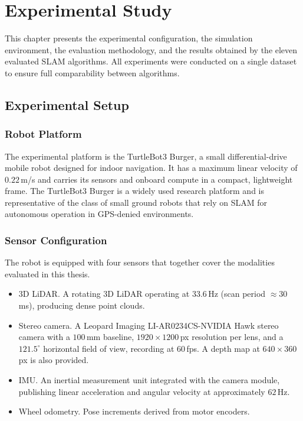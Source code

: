 \chapter{Experimental Study}

This chapter presents the experimental configuration, the simulation environment,
the evaluation methodology, and the results obtained by the eleven evaluated SLAM
algorithms.
All experiments were conducted on a single dataset to ensure full comparability
between algorithms.

\section{Experimental Setup}

\subsection{Robot Platform}

The experimental platform is the TurtleBot3 Burger, a small differential-drive
mobile robot designed for indoor navigation.
It has a maximum linear velocity of $0.22$\,m/s and carries its sensors and
onboard compute in a compact, lightweight frame.
The TurtleBot3 Burger is a widely used research platform and is representative
of the class of small ground robots that rely on SLAM for autonomous operation
in GPS-denied environments.

\subsection{Sensor Configuration}

The robot is equipped with four sensors that together cover the modalities
evaluated in this thesis.

\begin{itemize}
  \item 3D LiDAR. A rotating 3D LiDAR operating at $33.6$\,Hz
        (scan period $\approx 30$\,ms), producing dense point clouds.

  \item Stereo camera. A Leopard Imaging LI-AR0234CS-NVIDIA Hawk
        stereo camera with a $100$\,mm baseline, $1920 \times 1200$\,px
        resolution per lens, and a $121.5^{\circ}$ horizontal field of view, recording
        at $60$\,fps.
        A depth map at $640 \times 360$\,px is also provided.

  \item IMU. An inertial measurement unit integrated with the camera
        module, publishing linear acceleration and angular velocity at
        approximately $62$\,Hz.

  \item Wheel odometry. Pose increments derived from motor encoders.
\end{itemize}

